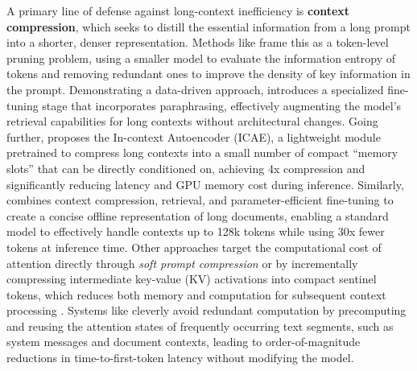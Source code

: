 \documentclass[11pt]{article}
\begin{document}
A primary line of defense against long-context inefficiency is \textbf{context compression}, which seeks to distill the essential information from a long prompt into a shorter, denser representation. Methods like \cite{ref617,ref618} frame this as a token-level pruning problem, using a smaller model to evaluate the information entropy of tokens and removing redundant ones to improve the density of key information in the prompt. Demonstrating a data-driven approach, \cite{ref619} introduces a specialized fine-tuning stage that incorporates paraphrasing, effectively augmenting the model's retrieval capabilities for long contexts without architectural changes. Going further, \cite{ref620} proposes the In-context Autoencoder (ICAE), a lightweight module pretrained to compress long contexts into a small number of compact ``memory slots'' that can be directly conditioned on, achieving 4x compression and significantly reducing latency and GPU memory cost during inference. Similarly, \cite{ref621} combines context compression, retrieval, and parameter-efficient fine-tuning to create a concise offline representation of long documents, enabling a standard model to effectively handle contexts up to 128k tokens while using 30x fewer tokens at inference time. Other approaches target the computational cost of attention directly through \emph{soft prompt compression} \cite{ref622} or by incrementally compressing intermediate key-value (KV) activations into compact sentinel tokens, which reduces both memory and computation for subsequent context processing \cite{ref209}. Systems like \cite{ref623} cleverly avoid redundant computation by precomputing and reusing the attention states of frequently occurring text segments, such as system messages and document contexts, leading to order-of-magnitude reductions in time-to-first-token latency without modifying the model.
\end{document}

